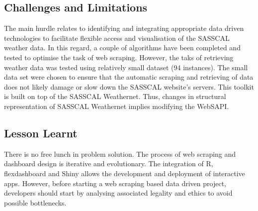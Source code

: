 \documentclass[a4paper, 10pt, conference]{ieeeconf}      %
\begin{document}
\subsection{\textbf{Challenges and Limitations}}
\noindent
The main  hurdle  relates to identifying and integrating appropriate data driven technologies to facilitate flexible access and visualisation of  the SASSCAL weather data. In this regard, a couple of algorithms have been completed and tested to optimise the   task of web scraping.
However, the taks of  retrieving weather data was tested using relatively small dataset (94 instances). The small data set were chosen to ensure that the automatic scraping and retrieving of data does not likely damage or slow down the SASSCAL website's servers. 
This toolkit is built on top of the SASSCAL Weathernet. Thus, changes in  structural representation of  SASSCAL Weathernet  implies modifying  the    WebSAPI.  

\subsection{\textbf{Lesson Learnt}}
\noindent
There is no free lunch in  problem solution. The process of web scraping and dashboard     design is iterative and evolutionary. The integration of R, flexdashboard and Shiny allows the development and  deployment of interactive apps. 
However, before starting a web scraping based  data driven project, developers   should   start by analysing  associated legality and ethics  \cite{mason1986four,krotov2020tutorial}   to avoid  possible bottlenecks.

\newpage
\noindent
\end{document}
